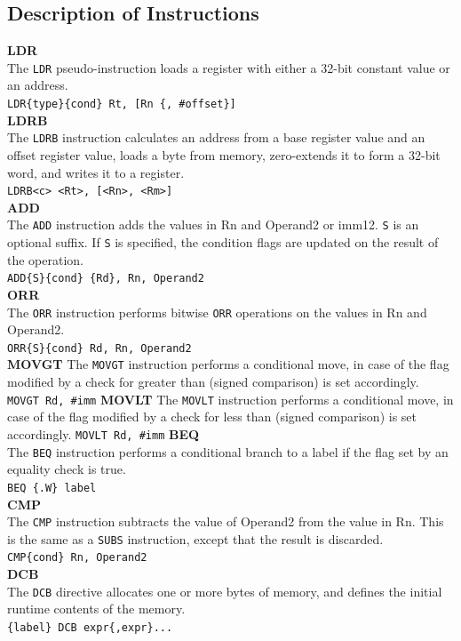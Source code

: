 \documentclass[footheight=20pt, footsepline, headheight=20pt, headsepline]{scrartcl}
\begin{document}
\subsection*{Description of Instructions}
\textbf{LDR}\\
The \verb|LDR| pseudo-instruction loads a register with either a 32-bit constant value or an address.\\
\verb|LDR{type}{cond} Rt, [Rn {, #offset}]| \\
\textbf{LDRB}\\
The \verb|LDRB| instruction calculates an address from a base register value and an offset register value, loads a byte from memory, zero-extends it to form a 32-bit word, and writes it to a register. \\
\verb|LDRB<c> <Rt>, [<Rn>, <Rm>]|\\\textbf{ADD}\\
The \verb|ADD| instruction adds the values in Rn and Operand2 or imm12. \verb|S| is an optional suffix. If \verb|S| is specified, the condition flags are updated on the result of the operation.\\
\verb|ADD{S}{cond} {Rd}, Rn, Operand2|\\
\textbf{ORR}\\
The \verb|ORR| instruction performs bitwise \verb|ORR| operations on the values in Rn and Operand2.\\
\verb|ORR{S}{cond} Rd, Rn, Operand2|\\
\textbf{MOVGT}
The \verb|MOVGT| instruction performs a conditional move, in case of the flag modified by a check for greater than (signed comparison) is set accordingly.
\verb|MOVGT Rd, #imm|
\textbf{MOVLT}
The \verb|MOVLT| instruction performs a conditional move, in case of the flag modified by a check for less than (signed comparison) is set accordingly.
\verb|MOVLT Rd, #imm|
\textbf{BEQ}\\
The \verb|BEQ| instruction performs a conditional branch to a label if the flag set by an equality check is true.\\
\verb|BEQ {.W} label|\\
\textbf{CMP}\\
The \verb|CMP| instruction subtracts the value of Operand2 from the value in Rn. This is the same as a \verb|SUBS| instruction, except that the result is discarded.\\
\verb|CMP{cond} Rn, Operand2|\\
\textbf{DCB}\\
The \verb|DCB| directive allocates one or more bytes of memory, and defines the initial runtime contents of the memory.\\
\verb|{label} DCB expr{,expr}...|\\
\end{document}
